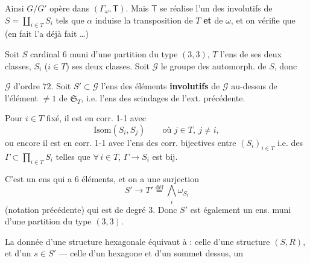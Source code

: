 \documentclass[11pt,a4paper]{article}
\begin{document}
 Ainsi $G/G'$ opère dans \struck{\ill{}} $(\Gamma_\omega,
\mathsf{T})$. Mais $\mathsf{T}$ se réalise   l'un
des   involutifs \struck{$\alpha_\psi$} de
$S = \coprod_{i \in T} S_i$ tels que $\alpha$ induise la transposition de $T$
\textbf{et} de $\omega$, et on vérifie que  (en fait \ill{} l'a déjà fait \ldots)



Soit $S$  cardinal $6$ muni d'une partition du type $(3,3)$, $T$ l'ens de ses deux classes,
$S_i$ ($i \in T$) ses deux classes. Soit $\mathcal{G}$ le groupe des automorph.
de $S$, donc


$\mathcal{G}$ d'ordre $72$. Soit $S' \subset \mathcal{G}$ l'ens des éléments
\textbf{involutifs} de $\mathcal{G}$ au-dessus de l'élément $\neq 1$ de
$\mathfrak{S}_T$, i.e. l'ens des scindages de l'ext. précédente.

Pour $i \in T$ fixé, il est en corr. 1-1 avec
\[
  \mathrm{Isom}(S_i, S_j) \qquad \text{où } j \in T,\ j \neq i,
\]
ou encore il est en corr. 1-1 avec l'ens des corr. bijectives entre
$(S_i)_{i \in T}$ i.e. des $\Gamma \subset \prod_{i \in T} S_i$ telles que
$\forall\, i \in T$, $\Gamma \to S_i$ est bij.


C'est un ens qui a $6$ éléments, et on a une  surjection
\[
  S' \longrightarrow T' \overset{\text{déf}}{=} \bigwedge_i \omega_{S_i}
\]
(notation précédente) qui est de degré $3$. Donc $S'$ est également un ens.
muni d'une partition du type $(3,3)$.

La donnée d'une structure hexagonale équivaut à : celle d'une structure
$(S, R)$, et d'un $s \in S'$ --- celle d'un hexagone et d'un sommet dessus,
 un
\end{document}
